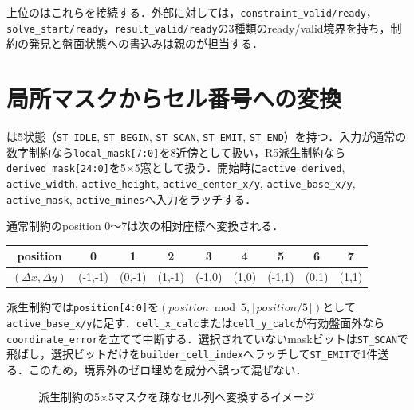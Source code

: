 上位のはこれらを接続する．外部に対しては，\texttt{constraint\_valid/ready}，\texttt{solve\_start/ready}，\texttt{result\_valid/ready}の3種類のready/valid境界を持ち，制約の発見と盤面状態への書込みは親のが担当する．

\section{局所マスクからセル番号への変換}
\label{sec:component-adapter}

は5状態（\texttt{ST\_IDLE}, \texttt{ST\_BEGIN}, \texttt{ST\_SCAN}, \texttt{ST\_EMIT}, \texttt{ST\_END}）を持つ．入力が通常の数字制約なら\texttt{local\_mask[7:0]}を8近傍として扱い，R5派生制約なら\texttt{derived\_mask[24:0]}を5×5窓として扱う．開始時に\texttt{active\_derived}, \texttt{active\_width}, \texttt{active\_height}, \texttt{active\_center\_x/y}, \texttt{active\_base\_x/y}, \texttt{active\_mask}, \texttt{active\_mines}へ入力をラッチする．

通常制約のposition 0〜7は次の相対座標へ変換される．
\begin{center}
\begin{tabular}{c|cccccccc}
\toprule
position &0&1&2&3&4&5&6&7\\
\midrule
$(\Delta x,\Delta y)$&(-1,-1)&(0,-1)&(1,-1)&(-1,0)&(1,0)&(-1,1)&(0,1)&(1,1)\\
\bottomrule
\end{tabular}
\end{center}

派生制約では\texttt{position[4:0]}を$(position\bmod5,\lfloor position/5\rfloor)$として\texttt{active\_base\_x/y}に足す．\texttt{cell\_x\_calc}または\texttt{cell\_y\_calc}が有効盤面外なら\texttt{coordinate\_error}を立てて中断する．選択されていないmaskビットは\texttt{ST\_SCAN}で飛ばし，選択ビットだけを\texttt{builder\_cell\_index}へラッチして\texttt{ST\_EMIT}で1件送る．このため，境界外のゼロ埋めを成分へ誤って混ぜない．

\begin{figure}[tb]
  \centering
  \caption{派生制約の5×5マスクを疎なセル列へ変換するイメージ}
  \label{fig:component-adapter-mask}
\end{figure}

